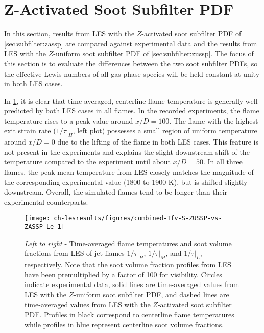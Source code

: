 \section{Z-Activated Soot Subfilter PDF}
\label{sec:lesresults:zassp}

In this section, results from LES with the $Z$-activated soot subfilter PDF of \cref{sec:subfilter:zassp} are compared against experimental data and the results from LES with the $Z$-uniform soot subfilter PDF of \cref{sec:subfilter:zussp}. The focus of this section is to evaluate the differences between the two soot subfilter PDFs, so the effective Lewis numbers of all gas-phase species will be held constant at unity in both LES cases.

In \cref{fig:lesresults:zassp:ctrlineleseval}, it is clear that time-averaged, centerline flame temperature is generally well-predicted by both LES cases in all flames. In the recorded experiments, the flame temperature rises to a peak value around $x/D = 100$. The flame with the highest exit strain rate ($1/\tau|_H$, left plot) possesses a small region of uniform temperature around $x/D = 0$ due to the lifting of the flame in both LES cases. This feature is not present in the experiments and explains the slight downstream shift of the temperature compared to the experiment until about $x/D = 50$. In all three flames, the peak mean temperature from LES closely matches the magnitude of the corresponding experimental value (1800 to 1900 K), but is shifted slightly downstream. Overall, the simulated flames tend to be longer than their experimental counterparts.

\begin{figure}[htb]
  \centering
  \texttt{[image: ch-lesresults/figures/combined-Tfv-S-ZUSSP-vs-ZASSP-Le\_1]}
  \caption[Centerline \texorpdfstring{$\langle T \rangle$}{<T>} \& \texorpdfstring{$\langle f_V \rangle$}{<fV>} from LES with \texorpdfstring{$Z$}{Z}-Activated Soot Subfilter PDF]{\textit{Left to right} - Time-averaged flame temperatures and soot volume fractions from LES of jet flames $1/\tau|_H$, $1/\tau|_M$, and $1/\tau|_L$, respectively. Note that the soot volume fraction profiles from LES have been premultiplied by a factor of 100 for visibility. Circles indicate experimental data, solid lines are time-averaged values from LES with the $Z$-uniform soot subfilter PDF, and dashed lines are time-averaged values from LES with the $Z$-activated soot subfilter PDF. Profiles in black correspond to centerline flame temperatures while profiles in blue represent centerline soot volume fractions.}
  \label{fig:lesresults:zassp:ctrlineleseval}
\end{figure}

